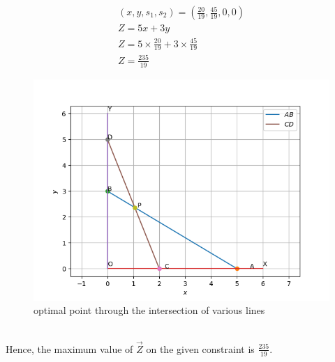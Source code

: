 \documentclass[journal,12pt,twocolumn]{IEEEtran}
\begin{document}
\begin{align}
(x,y,s_1,s_2)=\left(\frac{20}{19},\frac{45}{19},0,0\right)\\
Z=5x+3y\\
Z=5\times\frac{20}{19}+3\times\frac{45}{19}\\
Z=\frac{235}{19}
\end{align}
\begin{figure}[h]
\includegraphics[width=\columnwidth]{Figure_1.png}
\caption{optimal point through the intersection of various lines}
\label{fig:Figure_1}
\end{figure}\\
Hence, the maximum value of $\vec{Z}$ on the given constraint is $\frac{235}{19}$.
\end{document}
